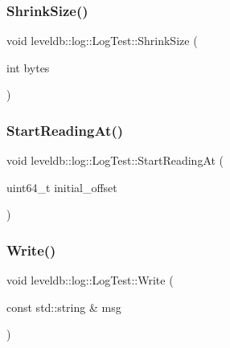 \subsubsection{\texorpdfstring{ShrinkSize()}{ShrinkSize()}}
{\footnotesize\ttfamily void leveldb\+::log\+::\+Log\+Test\+::\+Shrink\+Size (\begin{DoxyParamCaption}\item[{int}]{bytes }\end{DoxyParamCaption})\hspace{0.3cm}{\ttfamily [inline]}}

\mbox{\label{classleveldb_1_1log_1_1_log_test_a1fc5492e2eca6cb26b652322ed3cdc31}} 
\subsubsection{\texorpdfstring{StartReadingAt()}{StartReadingAt()}}
{\footnotesize\ttfamily void leveldb\+::log\+::\+Log\+Test\+::\+Start\+Reading\+At (\begin{DoxyParamCaption}\item[{uint64\+\_\+t}]{initial\+\_\+offset }\end{DoxyParamCaption})\hspace{0.3cm}{\ttfamily [inline]}}

\mbox{\label{classleveldb_1_1log_1_1_log_test_ab8af1c9335e7fbb42e06a6c01de2d0fc}} 
\subsubsection{\texorpdfstring{Write()}{Write()}}
{\footnotesize\ttfamily void leveldb\+::log\+::\+Log\+Test\+::\+Write (\begin{DoxyParamCaption}\item[{const std\+::string \&}]{msg }\end{DoxyParamCaption})\hspace{0.3cm}{\ttfamily [inline]}}

